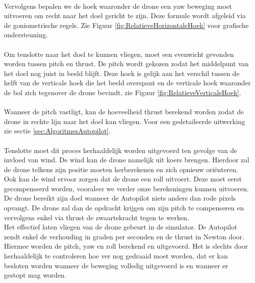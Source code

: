 \\
Vervolgens bepalen we de hoek waaronder de drone een yaw beweging moet uitvoeren om recht naar het doel gericht te zijn. Deze formule wordt afgeleid via de goniometrische regels. Zie Figuur \ref{fig:RelatieveHorizontaleHoek} voor grafische ondersteuning. 
\\
\\
Om tenslotte naar het doel te kunnen vliegen, moet een evenwicht gevonden worden tussen pitch en thrust. De pitch wordt gekozen zodat het middelpunt van het doel nog juist in beeld blijft. Deze hoek is gelijk aan het verschil tussen de helft van de verticale hoek die het beeld overspant en de verticale hoek waaronder de bol zich tegenover de drone bevindt, zie Figuur \ref{fig:RelatieveVerticaleHoek}. 
\\
\\
Wanneer de pitch vastligt, kan de hoeveelheid thrust berekend worden zodat de drone in rechte lijn naar het doel kan vliegen. Voor een gedetaileerde uitwerking zie sectie \ref{sec:AlgoritmesAutopilot}.
\\
\\
Tenslotte moet dit proces herhaaldelijk worden uitgevoerd ten gevolge van de invloed van wind. De wind kan de drone namelijk uit koers brengen. Hierdoor zal de drone telkens zijn positie moeten herberekenen en zich opnieuw ori\"enteren. Ook kan de wind ervoor zorgen dat de drone een roll uitvoert. Deze moet eerst gecompenseerd worden, vooraleer we verder onze berekeningen kunnen uitvoeren.
\\
De drone bereikt zijn doel wanneer de Autopilot niets anders dan rode pixels opvangt. De drone zal dan de opdracht krijgen om zijn pitch te compenseren en vervolgens enkel via thrust de zwaartekracht tegen te werken.
\\
Het effectief laten vliegen van de drone gebeurt in de simulator. De Autopilot zendt enkel de verhouding in graden per seconden en de thrust in Newton door. Hiermee worden de pitch, yaw en roll berekend en uitgevoerd. Het is slechts door herhaaldelijk te controleren hoe ver nog gedraaid moet worden, dat er kan besloten worden wanneer de beweging volledig uitgevoerd is en wanneer er gestopt mag worden.
\\
